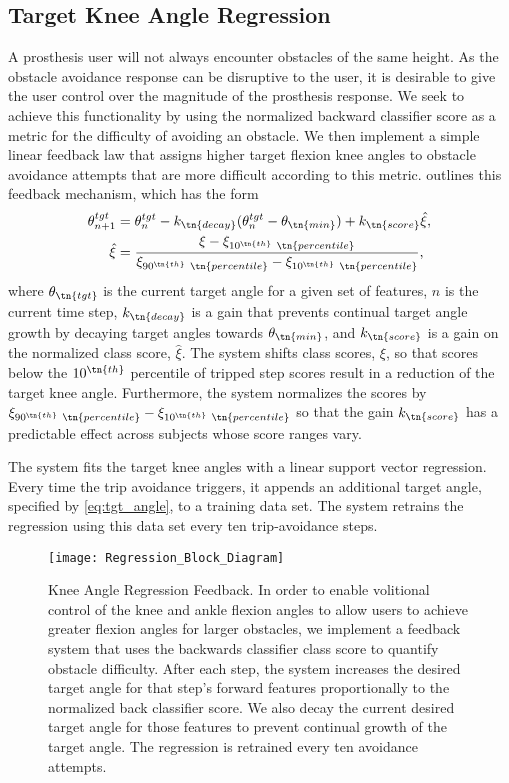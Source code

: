 \subsection{Target Knee Angle Regression}

A prosthesis user will not always encounter obstacles of the same height. As the
obstacle avoidance response can be disruptive to the user, it is desirable to
give the user control over the magnitude of the prosthesis response. We seek to
achieve this functionality by using the normalized backward classifier score as
a metric for the difficulty of avoiding an obstacle. We then implement a simple
linear feedback law that assigns higher target flexion knee angles to obstacle
avoidance attempts that are more difficult according to this metric.
 outlines this feedback mechanism, which has the form
\begin{align}
    \theta_{n+1}^{tgt} &= \theta_{n}^{tgt} - k_\tn{decay}(\theta_{n}^{tgt} - \theta_\tn{min})     + k_\tn{score} \hat{\xi},\label{eq:tgt_angle}\\
    \hat{\xi} &= \frac{\xi - \xi_{10^\tn{th} \ \tn{percentile}}}{\xi_{90^\tn{th} \ \tn{percentile}} - \xi_{10^\tn{th} \ \tn{percentile}}}, \label{eq:score_norm}
\end{align}
where $\theta_\tn{tgt}$ is the current target angle for a given set of features,
$n$ is the current time step, $k_\tn{decay}$ is a gain that prevents continual
target angle growth by decaying target angles towards $\theta_\tn{min}$, and
$k_\tn{score}$ is a gain on the normalized class score, $\hat{\xi}$. The system
shifts class scores, $\xi$, so that scores below the $10^\tn{th}$ percentile of
tripped step scores result in a reduction of the target knee angle. Furthermore,
the system normalizes the scores by $\xi_{90^\tn{th} \ \tn{percentile}} -
\xi_{10^\tn{th} \ \tn{percentile}}$ so that the gain $k_\tn{score}$ has a
predictable effect across subjects whose score ranges vary. 

The system fits the target knee angles with a linear support vector regression.
Every time the trip avoidance triggers, it appends an additional target angle,
specified by \cref{eq:tgt_angle}, to a training data set. The system retrains
the regression using this data set every ten trip-avoidance steps.

\begin{figure}[tb]
\centerline{\texttt{[image: Regression\_Block\_Diagram]}}
\caption{Knee Angle Regression Feedback. In order to enable volitional control
of the knee and ankle flexion angles to allow users to achieve greater flexion
angles for larger obstacles, we implement a feedback system that uses the
backwards classifier class score to quantify obstacle difficulty. After each
step, the system increases the desired target angle for that step's forward
features proportionally to the normalized back classifier score. We also decay
the current desired target angle for those features to prevent continual growth
of the target angle. The regression is retrained every ten avoidance attempts.}
\label{fig:knee_reg}
\end{figure}

